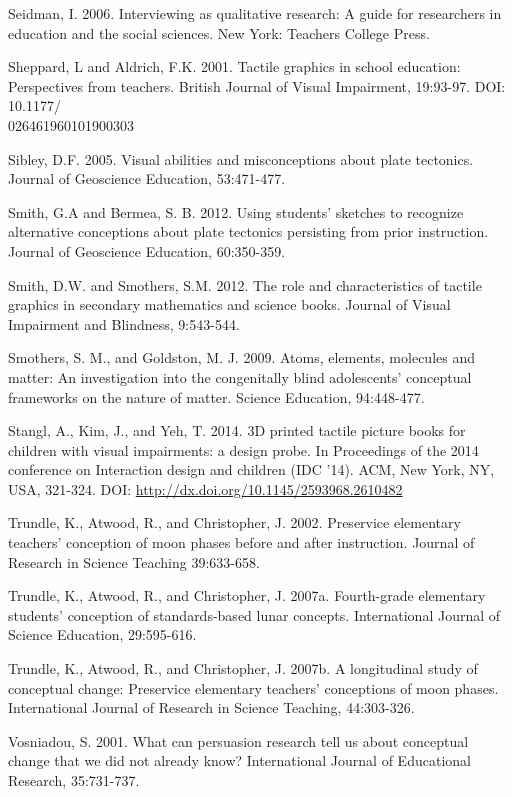 \documentclass[11.5pt]{sig-alternate} %
\begin{document}
Seidman, I. 2006. Interviewing as qualitative research: A guide for researchers in education and the social sciences.  New York: Teachers College Press.

Sheppard, L and Aldrich, F.K. 2001.  Tactile graphics in school education:  Perspectives from teachers.  British Journal of Visual Impairment, 19:93-97.  DOI: 10.1177/\\026461960101900303

Sibley, D.F. 2005.  Visual abilities and misconceptions about plate tectonics.  Journal of Geoscience Education, 53:471-477.

Smith, G.A and Bermea, S. B. 2012.  Using students’ sketches to recognize alternative conceptions about plate tectonics persisting from prior instruction.  Journal of Geoscience Education, 60:350-359.

Smith, D.W. and Smothers, S.M. 2012. The role and characteristics of tactile graphics in secondary mathematics and science books. Journal of Visual Impairment and Blindness, 9:543-544.  

Smothers, S. M., and Goldston, M. J. 2009. Atoms, elements, molecules and matter: An investigation into the congenitally blind adolescents' conceptual frameworks on the nature of matter. Science Education, 94:448-477.

Stangl, A., Kim, J., and Yeh, T. 2014. 3D printed tactile picture books for children with visual impairments: a design probe. In Proceedings of the 2014 conference on Interaction design and children (IDC '14). ACM, New York, NY, USA, 321-324. DOI: \url{http://dx.doi.org/10.1145/2593968.2610482}

Trundle, K., Atwood, R., and Christopher, J.  2002.  Preservice elementary teachers’ conception of moon phases before and after instruction.  Journal of Research in Science Teaching 39:633-658.

Trundle, K., Atwood, R., and Christopher, J.  2007a.  Fourth-grade elementary students’ conception of standards-based lunar concepts.  International Journal of Science Education, 29:595-616.

Trundle, K., Atwood, R., and Christopher, J. 2007b.  A longitudinal study of conceptual change:  Preservice elementary teachers’ conceptions of moon phases.  International Journal of Research in Science Teaching, 44:303-326.

Vosniadou, S. 2001.  What can persuasion research tell us about conceptual change that we did not already know?  International Journal of Educational Research, 35:731-737.
\end{document}

